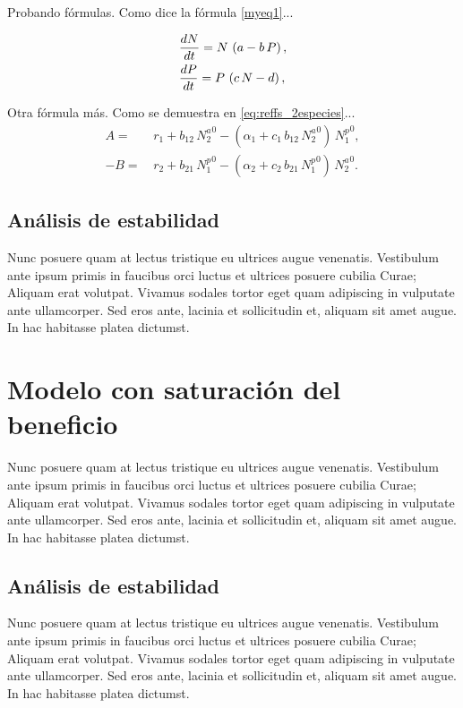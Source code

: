 Probando fórmulas. Como dice la fórmula \ref{myeq1}...

\begin{align}
\displaystyle &\frac{dN}{dt}=N\, \left(a-b \,P\right), \nonumber\\
\displaystyle &\frac{dP}{dt}=P\, \left(c\, N-d\right) , 
\label{myeq1}
\end{align}

Otra fórmula más. Como se demuestra en \ref{eq:reffs_2especies}...
\begin{align}
A = & \, r_{1}+ b_{12}\, {N_2^a}^0 - (\alpha_{1}+ c_{1} \, b_{12}\, {N_{2}^a}^0) \, {N_1^p}^0 , \nonumber\\
-B = &\, r_{2} + b_{21} \, {N_{1}^p}^0-(\alpha_{2}+ c_{2}\,  b_{21}\, {N_{1}^p}^0)\,  {N_{2}^a}^0 .
\label{eq:reffs_2especies}
\end{align}

\subsection{Análisis de estabilidad}

Nunc posuere quam at lectus tristique eu ultrices augue venenatis. Vestibulum ante ipsum primis in faucibus orci luctus et ultrices posuere cubilia Curae; Aliquam erat volutpat. Vivamus sodales tortor eget quam adipiscing in vulputate ante ullamcorper. Sed eros ante, lacinia et sollicitudin et, aliquam sit amet augue. In hac habitasse platea dictumst.

\section{Modelo con saturación del beneficio}

Nunc posuere quam at lectus tristique eu ultrices augue venenatis. Vestibulum ante ipsum primis in faucibus orci luctus et ultrices posuere cubilia Curae; Aliquam erat volutpat. Vivamus sodales tortor eget quam adipiscing in vulputate ante ullamcorper. Sed eros ante, lacinia et sollicitudin et, aliquam sit amet augue. In hac habitasse platea dictumst.

\subsection{Análisis de estabilidad}

Nunc posuere quam at lectus tristique eu ultrices augue venenatis. Vestibulum ante ipsum primis in faucibus orci luctus et ultrices posuere cubilia Curae; Aliquam erat volutpat. Vivamus sodales tortor eget quam adipiscing in vulputate ante ullamcorper. Sed eros ante, lacinia et sollicitudin et, aliquam sit amet augue. In hac habitasse platea dictumst.


